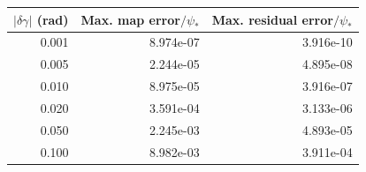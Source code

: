 \begin{tabular}{rrr}
\toprule
$|\delta\gamma|$ (rad) & Max. map error$/\psi_*$ & Max. residual error$/\psi_*$\\
\midrule
0.001 & 8.974e-07 & 3.916e-10 \\
0.005 & 2.244e-05 & 4.895e-08 \\
0.010 & 8.975e-05 & 3.916e-07 \\
0.020 & 3.591e-04 & 3.133e-06 \\
0.050 & 2.245e-03 & 4.893e-05 \\
0.100 & 8.982e-03 & 3.911e-04 \\
\bottomrule
\end{tabular}
